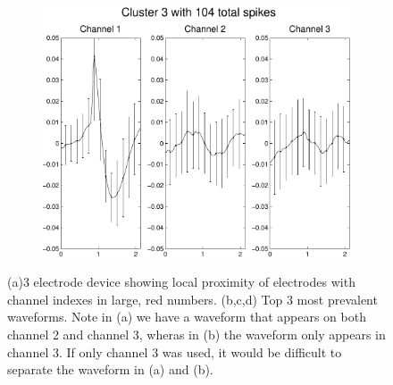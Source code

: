 \begin{center}
\begin{figure}
\begin{subfigure}[b]{.24\textwidth}
\caption{}
\label{ex32}
\end{subfigure}
\begin{subfigure}[b]{.24\textwidth}
\includegraphics[width=\textwidth]{../figs/3devim/clus3}
\caption{}
\label{ex33}
\end{subfigure}
\caption{(a)3 electrode device showing local proximity of electrodes with channel indexes in large, red numbers. (b,c,d) Top 3 most prevalent waveforms.  Note in (a) we have a waveform that appears on both channel 2 and channel 3, wheras in (b) the waveform only appears in channel 3.  If only channel 3 was used, it would be difficult to separate the waveform in (a) and (b).}
\end{figure}
\end{center}
